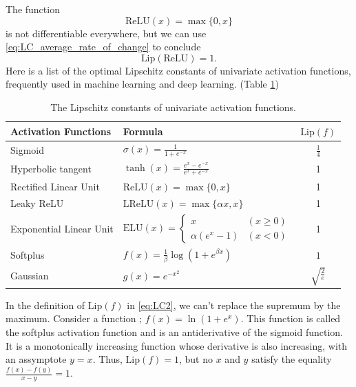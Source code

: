 \documentclass[12pt]{report}
\numberwithin{figure}{chapter}
\theoremstyle{plain}
\theoremstyle{definition}
\theoremstyle{corollary}
\theoremstyle{definition}
\theoremstyle{plain}
\theoremstyle{definition}
\theoremstyle{plain}
\newcommand\lip{\ensuremath{\text{Lip}}}
\begin{document}
The  function
\begin{equation}\label{eq:ReLU}
\text{ReLU}(x)=\max\{0,x\}
\end{equation}
 is not differentiable everywhere, but we can use \eqref{eq:LC_average_rate_of_change} to conclude
\begin{equation}\label{eq:ReLU_LC}
\lip(\text{ReLU})=1.
\end{equation}
Here is a list of the optimal Lipschitz constants of univariate activation functions, frequently used in machine learning and deep learning. (Table \ref{tab:univariate_activation_functions})
 
\renewcommand\arraystretch{1.5}
\begin{table}[t]
\centering
\caption{The Lipschitz constants of univariate activation functions.}
\label{tab:univariate_activation_functions}
\begin{tabular}[t]{llc}
\toprule
Activation Functions	&Formula									& $\lip(f)$\\
\midrule
Sigmoid				&$\sigma(x)=\frac1{1+e^{-x}}$				&$\frac14$\\
Hyperbolic tangent	&$\tanh(x)=\frac{e^x-e^{-x}}{e^x+e^{-x}}$	&1\\
Rectified Linear Unit	&$\text{ReLU}(x)=\max\{0,x\}$			&1\\
Leaky ReLU			&$\text{LReLU}(x)=\max\{\alpha x,x\}$	&1\\
Exponential Linear Unit&$\text{ELU}(x)=
\begin{cases}x&(x\ge0)\\\alpha(e^x-1)&(x<0)\end{cases}$	&1\\
Softplus			&$f(x)=\frac1\beta\log(1+e^{\beta x})$	&$1$\\
Gaussian			&$g(x)=e^{-x^2}$								&$\sqrt{\frac2e}$\\
\bottomrule
\end{tabular}
\end{table}

In the definition of \(\lip(f)\) in \eqref{eq:LC2}, we can't replace the supremum by the maximum.
Consider a function ; \(f(x)=\ln(1+e^x)\).
This function is called the softplus activation function and is an antiderivative of the sigmoid function.
It is a monotonically increasing function whose derivative is also increasing, with an assymptote \(y=x\).
Thus, \(\lip(f)=1\), but no \(x\) and \(y\) satisfy the equality \(\frac{f(x)-f(y)}{x-y}=1\).
\end{document}
